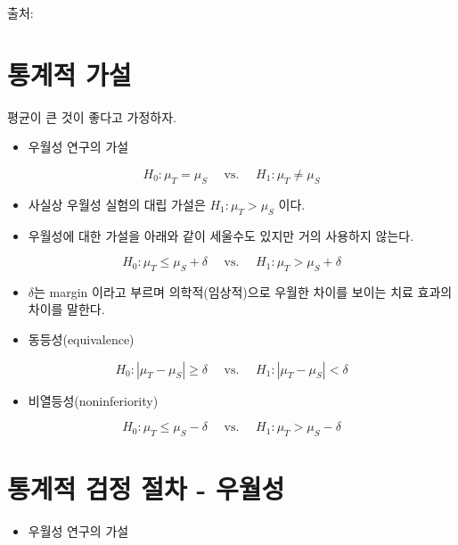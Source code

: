 \documentclass[
]{book}
\providecommand{\tightlist}{%
  \setlength{\itemsep}{0pt}\setlength{\parskip}{0pt}}
\begin{document}
출처: \citet{walker2011understanding}

\hypertarget{uxd1b5uxacc4uxc801-uxac00uxc124}{%
\section{통계적 가설}\label{uxd1b5uxacc4uxc801-uxac00uxc124}}

평균이 큰 것이 좋다고 가정하자.

\begin{itemize}
\tightlist
\item
  우월성 연구의 가설
\end{itemize}

\[ H_0 : \mu_T = \mu_S  \quad \text{ vs. } \quad H_1: \mu_T \ne \mu_S   \]

\begin{itemize}
\item
  사실상 우월성 실험의 대립 가설은 \(H_1: \mu_T > \mu_S\) 이다.
\item
  우월성에 대한 가설을 아래와 같이 세울수도 있지만 거의 사용하지 않는다.
\end{itemize}

\[ H_0 : \mu_T \le  \mu_S + \delta  \quad \text{ vs. } \quad H_1: \mu_T > \mu_S +   \delta \]

\begin{itemize}
\item
  \(\delta\)는 margin 이라고 부르며 의학적(임상적)으로 우월한 차이를 보이는 치료 효과의 차이를 말한다.
\item
  동등성(equivalence)
\end{itemize}

\[ H_0 : | \mu_T - \mu_S | \ge \delta \quad \text{ vs. } \quad H_1: | \mu_T - \mu_S| < \delta \]

\begin{itemize}
\tightlist
\item
  비열등성(noninferiority)
\end{itemize}

\[ H_0  : \mu_T \le  \mu_S - \delta  \quad \text{ vs. } \quad H_1: \mu_T > \mu_S -   \delta \]

\hypertarget{uxd1b5uxacc4uxc801-uxac80uxc815-uxc808uxcc28---uxc6b0uxc6d4uxc131}{%
\section{통계적 검정 절차 - 우월성}\label{uxd1b5uxacc4uxc801-uxac80uxc815-uxc808uxcc28---uxc6b0uxc6d4uxc131}}

\begin{itemize}
\tightlist
\item
  우월성 연구의 가설
\end{itemize}
\end{document}
